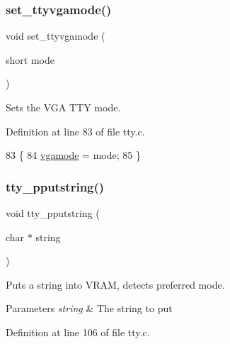 \subsubsection{\texorpdfstring{set\+\_\+ttyvgamode()}{set\_ttyvgamode()}}
{\footnotesize\ttfamily void set\+\_\+ttyvgamode (\begin{DoxyParamCaption}\item[{short}]{mode }\end{DoxyParamCaption})}



Sets the V\+GA T\+TY mode. 



Definition at line 83 of file tty.\+c.


\begin{DoxyCode}
83                                 \{
84     \hyperlink{a00179_af93b0649fdd1bea5b6d29ed37205aa2c_af93b0649fdd1bea5b6d29ed37205aa2c}{vgamode} = mode;
85 \}
\end{DoxyCode}
\mbox{\label{a00182_ade960b1320324706aac6c00cc6b1b2fe_ade960b1320324706aac6c00cc6b1b2fe}} 
\subsubsection{\texorpdfstring{tty\+\_\+pputstring()}{tty\_pputstring()}}
{\footnotesize\ttfamily void tty\+\_\+pputstring (\begin{DoxyParamCaption}\item[{char $\ast$}]{string }\end{DoxyParamCaption})}



Puts a string into V\+R\+AM, detects preferred mode. 


\begin{DoxyParams}{Parameters}
{\em string} & The string to put \\
\hline
\end{DoxyParams}


Definition at line 106 of file tty.\+c.


